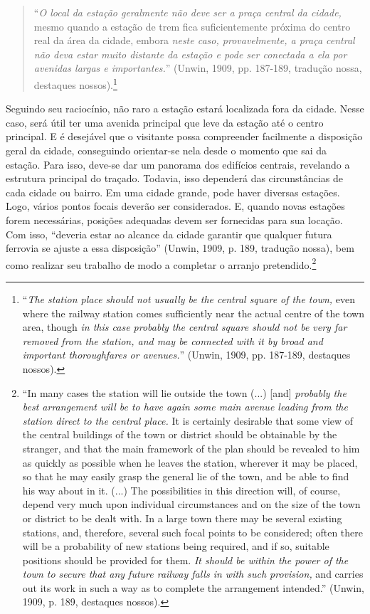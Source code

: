 \documentclass[12pt, a4paper]{book} %
\begin{document}
        \begin{quotation}
            ``\textit{O local da estação geralmente não deve ser a praça central da cidade,} mesmo quando a estação de trem fica suficientemente próxima do centro real da área da cidade, embora \textit{neste caso, provavelmente, a praça central não deva estar muito distante da estação e pode ser conectada a ela por avenidas largas e importantes.}'' (Unwin, 1909, pp. 187-189, tradução nossa, destaques nossos).\footnote[67]{``\textit{The station place should not usually be the central square of the town,} even where the railway station comes sufficiently near the actual centre of the town area, though \textit{in this case probably the central square should not be very far removed from the station, and may be connected with it by broad and important thoroughfares or avenues.}'' (Unwin, 1909, pp. 187-189, destaques nossos).}
        \end{quotation}

        Seguindo seu raciocínio, não raro a estação estará localizada fora da cidade. Nesse caso, será útil ter uma avenida principal que leve da estação até o centro principal. E é desejável que o visitante possa compreender facilmente a disposição geral da cidade, conseguindo orientar-se nela desde o momento que sai da estação. Para isso, deve-se dar um panorama dos edifícios centrais, revelando a estrutura principal do traçado. Todavia, isso dependerá das circunstâncias de cada cidade ou bairro. Em uma cidade grande, pode haver diversas estações. Logo, vários pontos focais deverão ser considerados. E, quando novas estações forem necessárias, posições adequadas devem ser fornecidas para sua locação. Com isso, ``deveria estar ao alcance da cidade garantir que qualquer futura ferrovia se ajuste a essa disposição'' (Unwin, 1909, p. 189, tradução nossa), bem como realizar seu trabalho de modo a completar o arranjo pretendido.\footnote[68]{``In many cases the station will lie outside the town (...) [and] \textit{probably the best arrangement will be to have again some main avenue leading from the station direct to the central place.} It is certainly desirable that some view of the central buildings of the town or district should be obtainable by the stranger, and that the main framework of the plan should be revealed to him as quickly as possible when he leaves the station, wherever it may be placed, so that he may easily grasp the general lie of the town, and be able to find his way about in it. (...) The possibilities in this direction will, of course, depend very much upon individual circumstances and on the size of the town or district to be dealt with. In a large town there may be several existing stations, and, therefore, several such focal points to be considered; often there will be a probability of new stations being required, and if so, suitable positions should be provided for them. \textit{It should be within the power of the town to secure that any future railway falls in with such provision,} and carries out its work in such a way as to complete the arrangement intended.'' (Unwin, 1909, p. 189, destaques nossos).}
\end{document}
